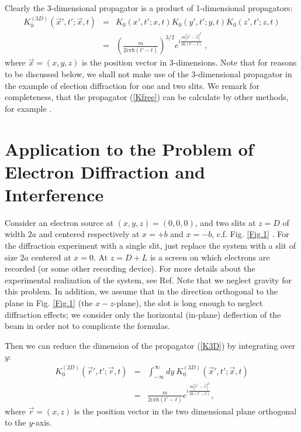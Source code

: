 \documentclass[12pt]{article}   %
\begin{document}
Clearly the 3-dimensional propagator is a product of 1-dimensional propagators:
\begin{eqnarray}\label{K3D}
K_{0}^{(3D)}(\overrightarrow{x}',t';\overrightarrow{x},t)&=&K_0(x',t';x,t)K_0(y',t';y,t)K_0(z',t';z,t)
{}\nonumber\\{}&=&\left(\frac{m}{2i\pi\hbar(t'-t)}\right)^{3/2}
e^{i\frac{m|\overrightarrow{x}'-\overrightarrow{x}|^2}{2\hbar(t'-t)}}\ , 
\end{eqnarray}
where $\overrightarrow{x}=(x,y,z)$ is the position vector in 3-dimensions.
Note that for reasons to be discussed below,
we shall not make use of the 3-dimensional propagator in the example 
of election diffraction for one and two slits. 
We remark for completeness, that the propagator (\ref{Kfree})
can be calculate by other methods, for example \cite{Kleinert}.


\section{Application to the Problem of Electron Diffraction and Interference}

Consider an electron source at $(x,y,z) = (0,0,0)$, and two slits
at $z=D$ of width $2a$ and centered respectively at $x=+b$ and
$x=-b$, c.f. Fig. \ref{Fig.1} . For the diffraction experiment with
a single slit, just replace the system with a slit of size $ 2a $
centered at $x=0$. At $ z = D + L $ is a screen on which electrons
are recorded (or some other recording device). For more details
about the experimental realization of the system, see Ref. \cite{Frabboni} 
Note that we neglect gravity for this
problem. In addition, we assume that in the direction orthogonal
to the plane in Fig. \ref{Fig.1} (the $x-z$-plane), the slot is long
enough to neglect diffraction effects; we consider only the
horizontal (in-plane) deflection of the beam in order not to
complicate the formulas. 

Then we can reduce the dimension of the propagator (\ref{K3D}) by integrating over $y$:
\begin{eqnarray}\label{K2D}
K_{0}^{(2D)}(\overrightarrow{r}',t';\overrightarrow{r},t)&=&
\int_{-\infty}^{\infty}dy\ K_{0}^{(3D)}(\overrightarrow{x}',t';\overrightarrow{x},t)
{}\nonumber\\{}&=&\frac{m}{2i\pi\hbar(t'-t)}
e^{i\frac{m|\overrightarrow{r}'-\overrightarrow{r}|^2}{2\hbar(t'-t)}},  
\end{eqnarray}
where $\overrightarrow{r}=(x,z)$ is the position vector in the two dimensional plane orthogonal to the $y$-axis.
\end{document}

